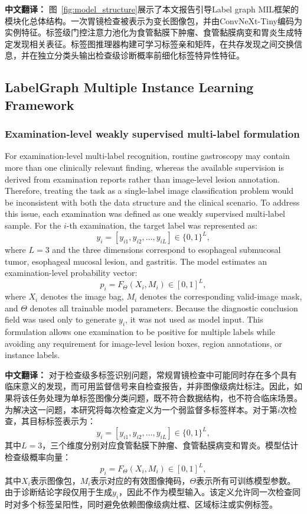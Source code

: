 \documentclass[Afour,sagev,times]{sagej}
\begin{document}
\textbf{中文翻译：} 图~\ref{fig:model_structure}展示了本文报告引导Label graph MIL框架的模块化总体结构。一次胃镜检查被表示为变长图像包，并由ConvNeXt-Tiny编码为实例特征。标签级门控注意力池化为食管黏膜下肿瘤、食管黏膜病变和胃炎生成特定发现相关表征。标签图推理器构建可学习标签亲和矩阵，在共存发现之间交换信息，并在独立分类头输出检查级诊断概率前细化标签特异性特征。

\subsection{LabelGraph Multiple Instance Learning Framework}
\subsubsection{Examination-level weakly supervised multi-label formulation}
For examination-level multi-label recognition, routine gastroscopy may contain more than one clinically relevant finding, whereas the available supervision is derived from examination reports rather than image-level lesion annotation. Therefore, treating the task as a single-label image classification problem would be inconsistent with both the data structure and the clinical scenario. To address this issue, each examination was defined as one weakly supervised multi-label sample. For the $i$-th examination, the target label was represented as:
\begin{equation}
y_i = [y_{i1},y_{i2},\ldots,y_{iL}] \in \{0,1\}^{L},
\end{equation}
where $L=3$ and the three dimensions correspond to esophageal submucosal tumor, esophageal mucosal lesion, and gastritis. The model estimates an examination-level probability vector:
\begin{equation}
p_i = F_{\Theta}(X_i, M_i) \in [0,1]^{L},
\end{equation}
where $X_i$ denotes the image bag, $M_i$ denotes the corresponding valid-image mask, and $\Theta$ denotes all trainable model parameters. Because the diagnostic conclusion field was used only to generate $y_i$, it was not used as model input. This formulation allows one examination to be positive for multiple labels while avoiding any requirement for image-level lesion boxes, region annotations, or instance labels.

\textbf{中文翻译：} 对于检查级多标签识别问题，常规胃镜检查中可能同时存在多个具有临床意义的发现，而可用监督信号来自检查报告，并非图像级病灶标注。因此，如果将该任务处理为单标签图像分类问题，既不符合数据结构，也不符合临床场景。为解决这一问题，本研究将每次检查定义为一个弱监督多标签样本。对于第$i$次检查，其目标标签表示为：
\begin{equation}
y_i = [y_{i1},y_{i2},\ldots,y_{iL}] \in \{0,1\}^{L},
\end{equation}
其中$L=3$，三个维度分别对应食管黏膜下肿瘤、食管黏膜病变和胃炎。模型估计检查级概率向量：
\begin{equation}
p_i = F_{\Theta}(X_i, M_i) \in [0,1]^{L},
\end{equation}
其中$X_i$表示图像包，$M_i$表示对应的有效图像掩码，$\Theta$表示所有可训练模型参数。由于诊断结论字段仅用于生成$y_i$，因此不作为模型输入。该定义允许同一次检查同时对多个标签呈阳性，同时避免依赖图像级病灶框、区域标注或实例标签。
\end{document}
